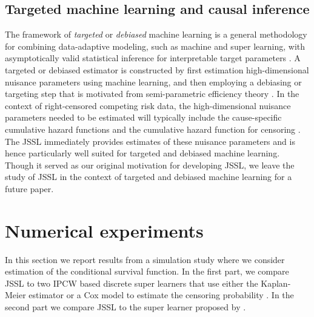 \documentclass[a4paper,danish]{article}
\theoremstyle{plain} %
\numberwithin{theorem}{section}
\theoremstyle{definition} %
\theoremstyle{remark}
\newcommand{\1}{\mathds{1}}
\begin{document}
\subsection{Targeted machine learning and causal inference}
\label{sec:targeted-learning}

The framework of \textit{targeted} or \textit{debiased}
machine learning is a general methodology for combining
data-adaptive modeling, such as machine and super learning,
with asymptotically valid statistical inference for
interpretable target parameters \citep{van2006targeted,
  chernozhukov2018double}. 
A targeted or debiased estimator is constructed by first
estimation high-dimensional nuisance parameters using machine
learning, and then employing a debiasing or targeting step
that is motivated from semi-parametric efficiency theory
\citep{pfanzagl1985contributions,bickel1993efficient,van2003unified,tsiatis2007semiparametric,kennedy2022semiparametric}.
In the context of right-censored competing risk data, the
high-dimensional nuisance parameters needed to be estimated
will typically include the cause-specific cumulative hazard
functions and the cumulative hazard function for censoring
\citep[e.g.,][]{van2003unified,rytgaard2021estimation,rytgaard2022targeted}.
The JSSL immediately provides estimates of these
nuisance parameters and is hence particularly well suited for
targeted and debiased machine learning. Though it served as
our original motivation for developing JSSL, we
leave the study of JSSL in the context of
targeted and debiased machine learning for a future paper.



\section{Numerical experiments}
\label{sec:numer-exper}


In this section we report results from a simulation study where we consider
estimation of the conditional survival function. In the first part, we compare
JSSL to two IPCW based discrete super learners that use either the
Kaplan-Meier estimator or a Cox model to estimate the censoring probability
\citep{gonzalez2021stacked}. In the second part we compare JSSL to
the super learner proposed by \cite{westling2021inference}.
\end{document}

